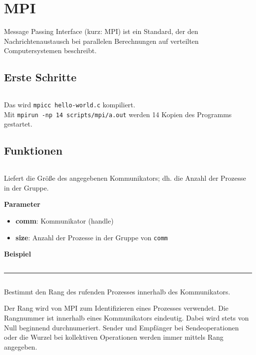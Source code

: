 \chapter{MPI}

Message Passing Interface (kurz: MPI) ist ein Standard, 
der den Nachrichtenaustausch bei parallelen Berechnungen auf 
verteilten Computersystemen beschreibt.

\section{Erste Schritte}
\inputminted[numbersep=5pt, tabsize=4, frame=lines, label=hello-world.c]{c}{scripts/mpi/hello-world.c}

Das wird \texttt{mpicc hello-world.c} kompiliert.\\
Mit \texttt{mpirun -np 14 scripts/mpi/a.out} werden 14 Kopien des Programms
gestartet.

\section{Funktionen}
\inputminted[numbersep=5pt, tabsize=4]{c}{scripts/mpi/comm-size.c}%
Liefert die Größe des angegebenen Kommunikators; dh. die Anzahl der Prozesse in der Gruppe.

\textbf{Parameter}
\begin{itemize}
    \item \textbf{comm}: Kommunikator (handle)
    \item \textbf{size}: Anzahl der Prozesse in der Gruppe von \texttt{comm}
\end{itemize}

\textbf{Beispiel}
\inputminted[numbersep=5pt, tabsize=4]{c}{scripts/mpi/comm-size-example.c}
\rule{\textwidth}{0.4pt}%
\inputminted[numbersep=5pt, tabsize=4]{c}{scripts/mpi/comm-rank.c}
Bestimmt den Rang des rufenden Prozesses innerhalb des Kommunikators.

Der Rang wird von MPI zum Identifizieren eines Prozesses verwendet. Die Rangnummer ist innerhalb eines Kommunikators eindeutig. Dabei wird stets von Null beginnend durchnumeriert. Sender und Empfänger bei Sendeoperationen oder die Wurzel bei kollektiven Operationen werden immer mittels Rang angegeben.

